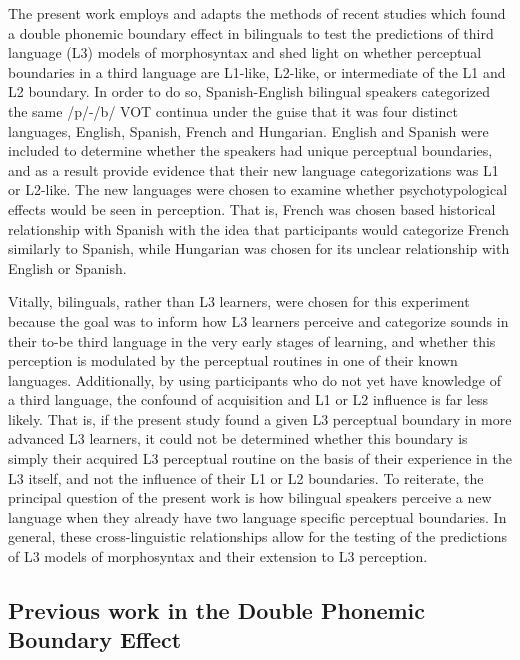 \documentclass[
  man,floatsintext]{apa6}
\begin{document}
The present work employs and adapts the methods of recent studies which found a double phonemic boundary effect in bilinguals to test the predictions of third language (L3) models of morphosyntax and shed light on whether perceptual boundaries in a third language are L1-like, L2-like, or intermediate of the L1 and L2 boundary.
In order to do so, Spanish-English bilingual speakers categorized the same /p/-/b/ VOT continua under the guise that it was four distinct languages, English, Spanish, French and Hungarian.
English and Spanish were included to determine whether the speakers had unique perceptual boundaries, and as a result provide evidence that their new language categorizations was L1 or L2-like.
The new languages were chosen to examine whether psychotypological effects would be seen in perception.
That is, French was chosen based historical relationship with Spanish with the idea that participants would categorize French similarly to Spanish, while Hungarian was chosen for its unclear relationship with English or Spanish.

Vitally, bilinguals, rather than L3 learners, were chosen for this experiment because the goal was to inform how L3 learners perceive and categorize sounds in their to-be third language in the very early stages of learning, and whether this perception is modulated by the perceptual routines in one of their known languages.
Additionally, by using participants who do not yet have knowledge of a third language, the confound of acquisition and L1 or L2 influence is far less likely.
That is, if the present study found a given L3 perceptual boundary in more advanced L3 learners, it could not be determined whether this boundary is simply their acquired L3 perceptual routine on the basis of their experience in the L3 itself, and not the influence of their L1 or L2 boundaries.
To reiterate, the principal question of the present work is how bilingual speakers perceive a new language when they already have two language specific perceptual boundaries.
In general, these cross-linguistic relationships allow for the testing of the predictions of L3 models of morphosyntax and their extension to L3 perception.

\hypertarget{previous-work-in-the-double-phonemic-boundary-effect}{%
\subsection{Previous work in the Double Phonemic Boundary Effect}\label{previous-work-in-the-double-phonemic-boundary-effect}}
\end{document}
